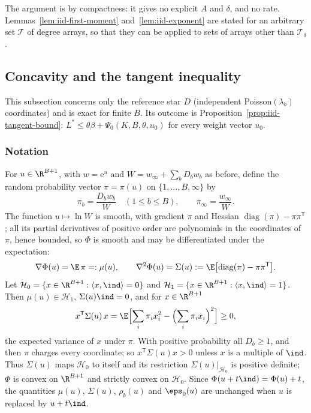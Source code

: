The argument is by compactness: it gives no explicit $A$ and $\delta$, and no rate.
Lemmas~\ref{lem:iid-first-moment} and~\ref{lem:iid-exponent} are stated for an arbitrary
set $\mathcal{T}$ of degree arrays, so that they can be applied to sets of arrays other
than $\mathcal{T}_\delta$.

\subsection{Concavity and the tangent inequality}\label{subsec:iid-concave}

This subsection concerns only the reference star $D$ (independent Poisson$(\lambda_b)$
coordinates) and is exact for finite $B$. Its outcome is
Proposition~\ref{prop:iid-tangent-bound}: $L^\ast\le\theta\beta+\Psi_0(K,B,\theta,u_0)$ for
every weight vector $u_0$.

\subsubsection*{Notation}
For $u\in\R^{B+1}$, with $w=\mathrm{e}^u$ and $W=w_\infty+\sum_bD_bw_b$ as before, define
the random probability vector $\pi=\pi(u)$ on $\{1,\dots,B,\infty\}$ by
\[
\pi_b=\frac{D_bw_b}{W}\quad(1\le b\le B),\qquad\pi_\infty=\frac{w_\infty}{W}.
\]
The function $u\mapsto\ln W$ is smooth, with gradient $\pi$ and Hessian
$\operatorname{diag}(\pi)-\pi\pi^{\mathsf T}$; all its partial derivatives of positive
order are polynomials in the coordinates of $\pi$, hence bounded, so $\Phi$ is smooth and
may be differentiated under the expectation:
\[
\nabla\Phi(u)=\E\,\pi=:\mu(u),\qquad
\nabla^2\Phi(u)=\Sigma(u):=\E\bigl[\operatorname{diag}(\pi)-\pi\pi^{\mathsf T}\bigr].
\]
Let $\mathcal{H}_0=\{x\in\R^{B+1}:\langle x,\ind\rangle=0\}$ and
$\mathcal{H}_1=\{x\in\R^{B+1}:\langle x,\ind\rangle=1\}$. Then $\mu(u)\in\mathcal{H}_1$,
$\Sigma(u)\ind=0$, and for $x\in\R^{B+1}$
\[
x^{\mathsf T}\Sigma(u)\,x=\E\Bigl[\sum_i\pi_ix_i^2-\Bigl(\sum_i\pi_ix_i\Bigr)^2\Bigr]\ge0,
\]
the expected variance of $x$ under $\pi$. With positive probability all $D_b\ge1$, and then
$\pi$ charges every coordinate; so $x^{\mathsf T}\Sigma(u)x>0$ unless $x$ is a multiple of
$\ind$. Thus $\Sigma(u)$ maps $\mathcal{H}_0$ to itself and its restriction
$\Sigma(u)|_{\mathcal{H}_0}$ is positive definite; $\Phi$ is convex on $\R^{B+1}$ and
strictly convex on $\mathcal{H}_0$. Since $\Phi(u+t\ind)=\Phi(u)+t$, the quantities
$\mu(u)$, $\Sigma(u)$, $\rho_b(u)$ and $\eps_0(u)$ are unchanged when $u$ is replaced by
$u+t\ind$.

